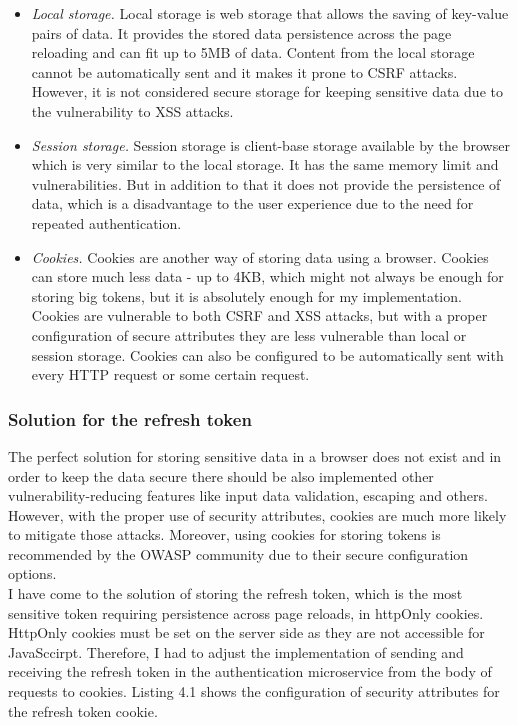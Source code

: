 \begin{itemize}
    \item \emph{Local storage.} Local storage is web storage that allows the saving of key-value pairs of data. It provides the stored data persistence across the page reloading and can fit up to 5MB of data. Content from the local storage cannot be automatically sent and it makes it prone to CSRF attacks. However, it is not considered secure storage for keeping sensitive data due to the vulnerability to XSS attacks.
    \item \emph{Session storage.} Session storage is client-base storage available by the browser which is very similar to the local storage. It has the same memory limit and vulnerabilities. But in addition to that it does not provide the persistence of data, which is a disadvantage to the user experience due to the need for repeated authentication.
    \item \emph{Cookies.} Cookies are another way of storing data using a browser. Cookies can store much less data - up to 4KB, which might not always be enough for storing big tokens, but it is absolutely enough for my implementation. Cookies are vulnerable to both CSRF and XSS attacks, but with a proper configuration of secure attributes they are less vulnerable than local or session storage. Cookies can also be configured to be automatically sent with every HTTP request or some certain request.
\end{itemize}

\subsubsection{Solution for the refresh token} The perfect solution for storing sensitive data in a browser does not exist and in order to keep the data secure there should be also implemented other vulnerability-reducing features like input data validation, escaping and others. However, with the proper use of security attributes, cookies are much more likely to mitigate those attacks. \cite{ls-vs-cookies} Moreover, using cookies for storing tokens is recommended by the OWASP \cite{owasp} community due to their secure configuration options. \cite{ls-vs-cookies-2} \\
I have come to the solution of storing the refresh token, which is the most sensitive token requiring persistence across page reloads, in httpOnly cookies. HttpOnly cookies must be set on the server side as they are not accessible for JavaSccirpt. Therefore, I had to adjust the implementation of sending and receiving the refresh token in the authentication microservice from the body of requests to cookies. Listing 4.1 shows the configuration of security attributes for the refresh token cookie.


